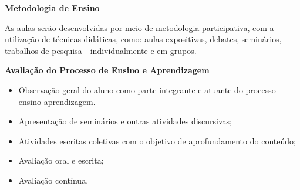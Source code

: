 






\begin{snugshade}\begin{center}\textbf{
    Metodologia de Ensino
}\end{center}\end{snugshade}

\noindent
 As aulas serão desenvolvidas por meio de metodologia participativa, com a utilização de técnicas didáticas, como: aulas expositivas, debates, seminários, trabalhos de pesquisa - individualmente e em grupos.

\begin{snugshade}\begin{center}\textbf{
    Avaliação do Processo de Ensino e Aprendizagem
}\end{center}\end{snugshade}

\noindent
\begin{itemize}
	\item Observação geral do aluno como parte integrante e atuante do processo ensino-aprendizagem.
	\item Apresentação de seminários e outras atividades discursivas;
	\item Atividades escritas coletivas com o objetivo de aprofundamento do conteúdo;
	\item Avaliação oral e escrita;
	\item Avaliação contínua.
\end{itemize}

